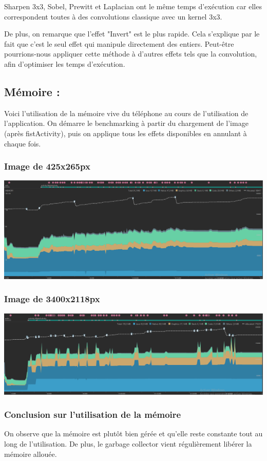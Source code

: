 Sharpen 3x3, Sobel, Prewitt et Laplacian ont le même temps d'exécution car elles correspondent toutes à des convolutions classique avec un kernel 3x3.

De plus, on remarque que l'effet "Invert" est le plus rapide. Cela s'explique par le fait que c'est le seul effet qui manipule directement des entiers. Peut-être pourrions-nous appliquer cette méthode à d'autres effets tels que la convolution, afin d'optimiser les temps d'exécution.

\subsection{Mémoire :}

Voici l'utilisation de la mémoire vive du téléphone au cours de l'utilisation de l'application. On démarre le benchmarking à partir du chargement de l'image (après fistActivity), puis on applique tous les effets disponibles en annulant à chaque fois.
\subsubsection*{Image de 425x265px}
\includegraphics[width=1\textwidth]{report_src/memory/425x265.PNG}

\subsubsection*{Image de 3400x2118px}
\includegraphics[width=1\textwidth]{report_src/memory/3400x2118.PNG}

\subsubsection*{Conclusion sur l'utilisation de la mémoire}
On observe que la mémoire est plutôt bien gérée et qu'elle reste constante tout au long de l'utilisation. De plus, le garbage collector vient régulièrement libérer la mémoire allouée.

